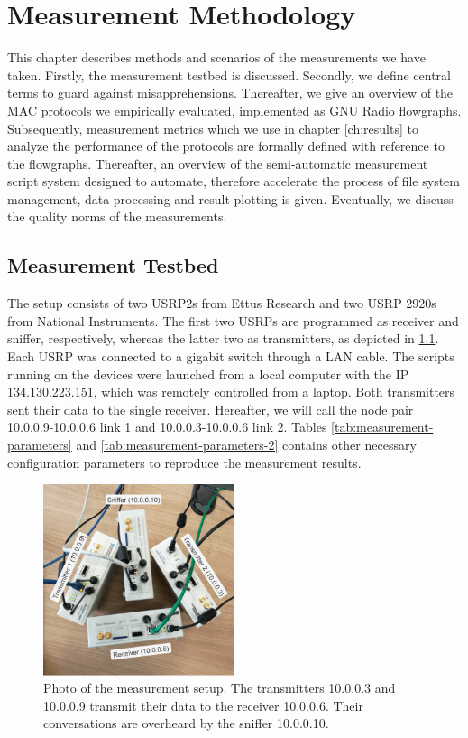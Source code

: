 \chapter{Measurement Methodology}
\label{ch:methodology}

This chapter describes methods and scenarios of the measurements we have taken. Firstly, the measurement testbed is discussed. Secondly, we define central terms to guard against misapprehensions. Thereafter, we give an overview of the MAC protocols we empirically evaluated, implemented as GNU Radio flowgraphs. Subsequently, measurement metrics which we use in chapter \ref{ch:results} to analyze the performance of the protocols are formally defined with reference to the flowgraphs. Thereafter, an overview of the semi-automatic measurement script system designed to automate, therefore accelerate the process of file system management, data processing and result plotting is given. Eventually, we discuss the quality norms of the measurements.

\section{Measurement Testbed}

The setup consists of two USRP2s from Ettus Research and two USRP 2920s from National Instruments. The first two USRPs are programmed as receiver and sniffer, respectively, whereas the latter two as transmitters, as depicted in \ref{fig:measurement-setup}. Each USRP was connected to a gigabit switch through a LAN cable. The scripts running on the devices were launched from a local computer with the IP 134.130.223.151, which was remotely controlled from a laptop. Both transmitters sent their data to the single receiver. Hereafter, we will call the node pair 10.0.0.9-10.0.0.6 link 1 and 10.0.0.3-10.0.0.6 link 2. Tables \ref{tab:measurement-parameters} and \ref{tab:measurement-parameters-2}  contains other necessary configuration parameters to reproduce the measurement results.

\begin{figure}[tb]
	\label{fig:measurement-setup}
	\begin{center}
		\includegraphics[width=0.5\textwidth]{pictures/measurement_setup}
	\end{center}
	\caption{Photo of the measurement setup. The transmitters 10.0.0.3 and 10.0.0.9 transmit their data to the receiver 10.0.0.6. Their conversations are overheard by the sniffer 10.0.0.10.}
\end{figure}


